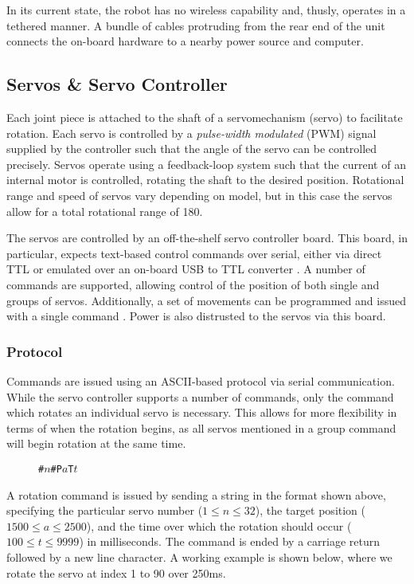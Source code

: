 In its current state, the robot has no wireless capability and, thusly, operates in a tethered manner. A bundle of cables protruding from the rear end of the unit connects the on-board hardware to a nearby power source and computer.

\subsection{Servos \& Servo Controller}
Each joint piece is attached to the shaft of a servomechanism (servo) to facilitate rotation. Each servo is controlled by a \emph{pulse-width modulated} (PWM) signal supplied by the controller such that the angle of the servo can be controlled precisely. Servos operate using a feedback-loop system such that the current of an internal motor is controlled, rotating the shaft to the desired position. Rotational range and speed of servos vary depending on model, but in this case the servos allow for a total rotational range of 180\textdegree.

The servos are controlled by an off-the-shelf servo controller board. This board, in particular, expects text-based control commands over serial, either via direct TTL or emulated over an on-board USB to TTL converter \cite{torobot_manual}. A number of commands are supported, allowing control of the position of both single and groups of servos. Additionally, a set of movements can be programmed and issued with a single command \cite{torobot_manual}. Power is also distrusted to the servos via this board.

\subsubsection{Protocol}

Commands are issued using an ASCII-based protocol via serial communication. While the servo controller supports a number of commands, only the command which rotates an individual servo is necessary. This allows for more flexibility in terms of when the rotation begins, as all servos mentioned in a group command will begin rotation at the same time.

\begin{figure}[!h]
    \centering
    \texttt{\#\(n\)\#P\(a\)T\(t\)}
\end{figure}

A rotation command is issued by sending a string in the format shown above, specifying the particular servo number ($1 \leq n \leq 32$), the target position ($1500 \leq a \leq 2500$), and the time over which the rotation should occur ($100 \leq t \leq 9999$) in milliseconds. The command is ended by a carriage return followed by a new line character. A working example is shown below, where we rotate the servo at index 1 to 90\textdegree{} over 250ms.


